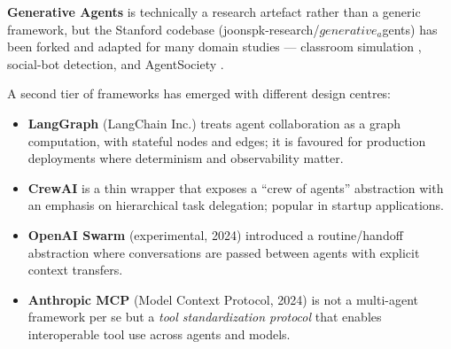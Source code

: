 \documentclass{article}
\begin{document}
\textbf{Generative Agents} \citep{park2023generativeagentsin} is technically a research artefact rather than a generic framework, but the Stanford codebase (joonspk-research/\(generative_a\)gents) has been forked and adapted for many domain studies --- classroom simulation \citep{zhang20252025}, social-bot detection, and AgentSociety \citep{piao20252025}.

A second tier of frameworks has emerged with different design centres:

\begin{itemize}

\item
  \textbf{LangGraph} (LangChain Inc.) treats agent collaboration as a graph computation, with stateful nodes and edges; it is favoured for production deployments where determinism and observability matter.
\item
  \textbf{CrewAI} is a thin wrapper that exposes a ``crew of agents'' abstraction with an emphasis on hierarchical task delegation; popular in startup applications.
\item
  \textbf{OpenAI Swarm} (experimental, 2024) introduced a routine/handoff abstraction where conversations are passed between agents with explicit context transfers.
\item
  \textbf{Anthropic MCP} (Model Context Protocol, 2024) is not a multi-agent framework per se but a \emph{tool standardization protocol} that enables interoperable tool use across agents and models.
\end{itemize}
\end{document}
